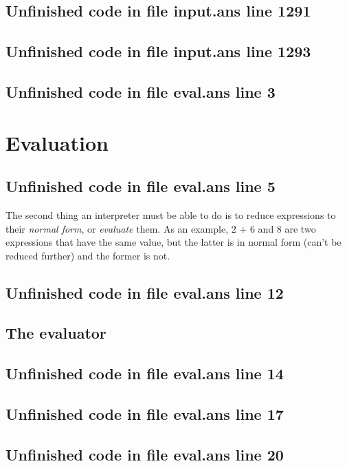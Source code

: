 \documentclass[twoside,9pt]{report}
\begin{document}
\section{Unfinished code in file input.ans line 1291}
\section{Unfinished code in file input.ans line 1293}
\section{Unfinished code in file eval.ans line 3}
\chapter{Evaluation}
\label{evaluation}
\section{Unfinished code in file eval.ans line 5}


The second thing an interpreter must be able to do is to reduce expressions to their \emph{normal form}, or \emph{evaluate} them. As an example, 2 + 6 and 8 are two expressions that have the same value, but the latter is in normal form (can't be reduced further) and the former is not.

\section{Unfinished code in file eval.ans line 12}
\section{The evaluator}
\label{the-evaluator}
\section{Unfinished code in file eval.ans line 14}

\section{Unfinished code in file eval.ans line 17}
\section{Unfinished code in file eval.ans line 20}
\end{document}
